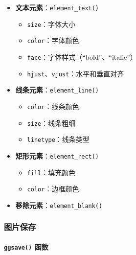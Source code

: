 \documentclass[
]{book}
\providecommand{\tightlist}{%
  \setlength{\itemsep}{0pt}\setlength{\parskip}{0pt}}
\begin{document}
\begin{itemize}
\tightlist
\item
  \textbf{文本元素}：\texttt{element\_text()}

  \begin{itemize}
  \tightlist
  \item
    \texttt{size}：字体大小
  \item
    \texttt{color}：字体颜色
  \item
    \texttt{face}：字体样式（``bold''、``italic''）
  \item
    \texttt{hjust}、\texttt{vjust}：水平和垂直对齐
  \end{itemize}
\item
  \textbf{线条元素}：\texttt{element\_line()}

  \begin{itemize}
  \tightlist
  \item
    \texttt{color}：线条颜色
  \item
    \texttt{size}：线条粗细
  \item
    \texttt{linetype}：线条类型
  \end{itemize}
\item
  \textbf{矩形元素}：\texttt{element\_rect()}

  \begin{itemize}
  \tightlist
  \item
    \texttt{fill}：填充颜色
  \item
    \texttt{color}：边框颜色
  \end{itemize}
\item
  \textbf{移除元素}：\texttt{element\_blank()}
\end{itemize}

\hypertarget{ux56feux7247ux4fddux5b58}{%
\subsubsection{图片保存}\label{ux56feux7247ux4fddux5b58}}

\hypertarget{ggsave-ux51fdux6570}{%
\paragraph{\texorpdfstring{\texttt{ggsave()} 函数}{ggsave() 函数}}\label{ggsave-ux51fdux6570}}
\end{document}
